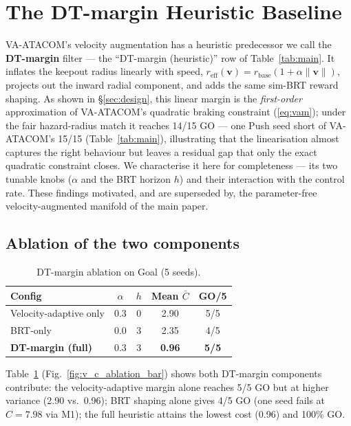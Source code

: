 \appendix
\section{The DT-margin Heuristic Baseline}
\label{app:dtmargin}

VA-ATACOM's velocity augmentation has a heuristic predecessor we call the \textbf{DT-margin} filter --- the ``DT-margin (heuristic)'' row of Table~\ref{tab:main}. It inflates the keepout radius linearly with speed, $r_\text{eff}(\boldsymbol{v}) = r_\text{base}(1+\alpha\|\boldsymbol{v}\|)$, projects out the inward radial component, and adds the same sim-BRT reward shaping. As shown in \S\ref{sec:design}, this linear margin is the \emph{first-order} approximation of VA-ATACOM's quadratic braking constraint (\ref{eq:vam}); under the fair hazard-radius match it reaches 14/15 GO --- one Push seed short of VA-ATACOM's 15/15 (Table~\ref{tab:main}), illustrating that the linearisation almost captures the right behaviour but leaves a residual gap that only the exact quadratic constraint closes. We characterise it here for completeness --- its two tunable knobs ($\alpha$ and the BRT horizon $h$) and their interaction with the control rate. These findings motivated, and are superseded by, the parameter-free velocity-augmented manifold of the main paper.

\subsection{Ablation of the two components}

\begin{table}[t]
\centering
\caption{DT-margin ablation on Goal (5 seeds).}
\label{tab:ablation}
\begin{tabular}{lcccc}
\toprule
Config & $\alpha$ & $h$ & Mean $\bar{C}$ & GO/5 \\
\midrule
Velocity-adaptive only & 0.3 & 0 & 2.90 & 5/5 \\
BRT-only & 0.0 & 3 & 2.35 & 4/5 \\
\textbf{DT-margin (full)} & 0.3 & 3 & \textbf{0.96} & \textbf{5/5} \\
\bottomrule
\end{tabular}
\end{table}



Table~\ref{tab:ablation} (Fig.~\ref{fig:v_c_ablation_bar}) shows both DT-margin components contribute: the velocity-adaptive margin alone reaches 5/5 GO but at higher variance (2.90 vs.\ 0.96); BRT shaping alone gives 4/5 GO (one seed fails at $C=7.98$ via M1); the full heuristic attains the lowest cost (0.96) and 100\% GO.

